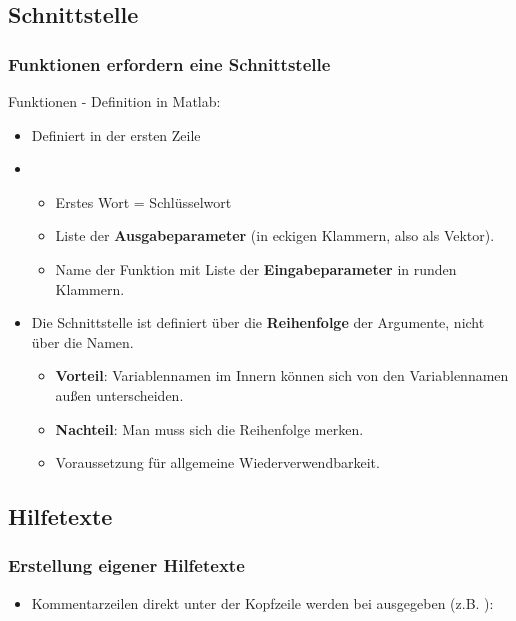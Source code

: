   \subsection{Schnittstelle}
  \begin{frame}
      \frametitle{Funktionen erfordern eine Schnittstelle}
      Funktionen - Definition in Matlab:
      \begin{itemize}
        \item Definiert in der ersten Zeile
        \item {}
        \begin{itemize}
          \item Erstes Wort = Schlüsselwort 
          \item Liste der \textbf{Ausgabeparameter} (in eckigen Klammern, also als Vektor).
          \item Name der Funktion mit Liste der \textbf{Eingabeparameter} in runden Klammern.
        \end{itemize}
        \item Die Schnittstelle ist definiert über die \textbf{Reihenfolge} der Argumente, nicht über die Namen.
        \begin{itemize}
          \item \textbf{Vorteil}: Variablennamen im Innern können sich von den Variablennamen außen unterscheiden.
          \item \textbf{Nachteil}: Man muss sich die Reihenfolge merken.
          \item Voraussetzung für allgemeine Wiederverwendbarkeit.
        \end{itemize}
      \end{itemize}
  \end{frame}

  \subsection{Hilfetexte}
  \begin{frame}
      \frametitle{Erstellung eigener Hilfetexte}
      \begin{itemize}
        \item Kommentarzeilen direkt unter der Kopfzeile werden bei  ausgegeben
        (z.B. ):
        
      \end{itemize}
  \end{frame}

